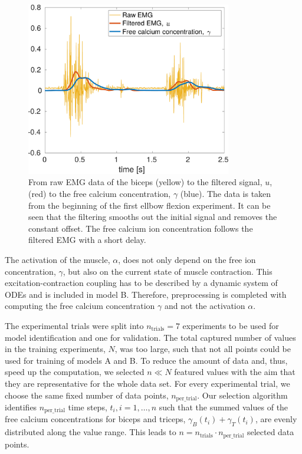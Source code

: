 \begin{figure}%
  \centering%
  \includegraphics[width=0.8\textwidth]{images/summer_school_study/emg_filtering.pdf}%
  \caption{From raw EMG data of the biceps (yellow) to the filtered signal, $u$, (red) to the free calcium concentration, $\gamma$ (blue). The data is taken from the beginning of the first ellbow flexion experiment. It can be seen that the filtering smooths out the initial signal and removes the constant offset. The free calcium ion concentration follows the filtered EMG with a short delay.}%
  \label{fig:emg_filtering}%
\end{figure}%

The activation of the muscle, $\alpha$, does not only depend on the free ion concentration, $\gamma$, but also on the current state of muscle contraction. This excitation-contraction coupling has to be described by a dynamic system of ODEs and is included in model B.
Therefore, preprocessing is completed with computing the free calcium concentration $\gamma$ and not the activation $\alpha$.

The experimental trials were split into $n_\text{trials}=7$ experiments to be used for model identification and one for validation.
The total captured number of values in the training experiments, $N$, was too large, such that not all points could be used for training of models A and B.
To reduce the amount of data and, thus, speed up the computation, we selected $n \ll N$ featured values with the aim that they are representative for the whole data set.
For every experimental trial, we choose the same fixed number of data points, $n_\text{per\_trial}$.
Our selection algorithm identifies $n_\text{per\_trial}$ time steps, $t_i, i=1, \dots, n$ such that the summed values of the free calcium concentrations for biceps and triceps, $\gamma_B(t_i) + \gamma_T(t_i)$, are evenly distributed along the value range.
This leads to $n = n_\text{trials} \cdot n_\text{per\_trial}$ selected data points.

